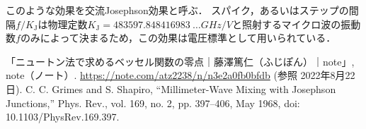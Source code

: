 \documentclass[dvipdfmx,autodetect-engine,12pt,fleqn]{jsarticle}
\begin{document}


このような効果を交流Josephson効果と呼ぶ．
スパイク，あるいはステップの間隔$f/K_{\text{J}}$は物理定数$K_{\text{J}}=\SI{483597.848416983 }{\dots GHz/V}$と照射するマイクロ波の振動数$f$のみによって決まるため，この効果は電圧標準として用いられている．

\begin{thebibliography}{99}
   「ニュートン法で求めるベッセル関数の零点｜藤澤篤仁（ふじぽん）｜note」, note（ノート）. \url{https://note.com/atz2238/n/n3e2a0fb0bfdb} (参照 2022年8月22日).
   C. C. Grimes and S. Shapiro, “Millimeter-Wave Mixing with Josephson Junctions,” Phys. Rev., vol. 169, no. 2, pp. 397–406, May 1968, doi: 10.1103/PhysRev.169.397.
\end{thebibliography}
\end{document}
